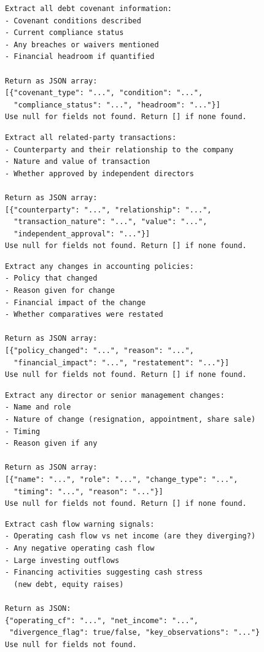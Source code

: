 \documentclass[12pt,a4paper]{article}
\begin{document}
\begin{lstlisting}[language={}, caption={Extraction prompt: Debt Covenants}]
Extract all debt covenant information:
- Covenant conditions described
- Current compliance status
- Any breaches or waivers mentioned
- Financial headroom if quantified

Return as JSON array:
[{"covenant_type": "...", "condition": "...",
  "compliance_status": "...", "headroom": "..."}]
Use null for fields not found. Return [] if none found.
\end{lstlisting}

\begin{lstlisting}[language={}, caption={Extraction prompt: Related Party Transactions}]
Extract all related-party transactions:
- Counterparty and their relationship to the company
- Nature and value of transaction
- Whether approved by independent directors

Return as JSON array:
[{"counterparty": "...", "relationship": "...",
  "transaction_nature": "...", "value": "...",
  "independent_approval": "..."}]
Use null for fields not found. Return [] if none found.
\end{lstlisting}

\begin{lstlisting}[language={}, caption={Extraction prompt: Accounting Policy Changes}]
Extract any changes in accounting policies:
- Policy that changed
- Reason given for change
- Financial impact of the change
- Whether comparatives were restated

Return as JSON array:
[{"policy_changed": "...", "reason": "...",
  "financial_impact": "...", "restatement": "..."}]
Use null for fields not found. Return [] if none found.
\end{lstlisting}

\begin{lstlisting}[language={}, caption={Extraction prompt: Director Changes}]
Extract any director or senior management changes:
- Name and role
- Nature of change (resignation, appointment, share sale)
- Timing
- Reason given if any

Return as JSON array:
[{"name": "...", "role": "...", "change_type": "...",
  "timing": "...", "reason": "..."}]
Use null for fields not found. Return [] if none found.
\end{lstlisting}

\begin{lstlisting}[language={}, caption={Extraction prompt: Cash Flow Warnings}]
Extract cash flow warning signals:
- Operating cash flow vs net income (are they diverging?)
- Any negative operating cash flow
- Large investing outflows
- Financing activities suggesting cash stress
  (new debt, equity raises)

Return as JSON:
{"operating_cf": "...", "net_income": "...",
 "divergence_flag": true/false, "key_observations": "..."}
Use null for fields not found.
\end{lstlisting}
\end{document}
